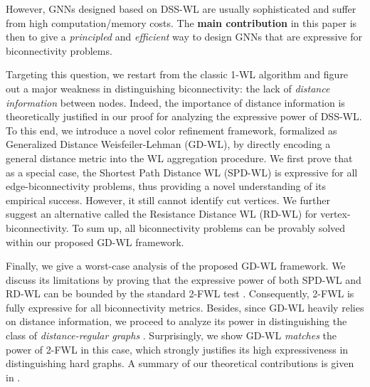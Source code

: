 \documentclass{article}
\let\cref\crtcref
\begin{document}
However, GNNs designed based on DSS-WL are usually sophisticated and suffer from high computation/memory costs. The \textbf{main contribution} in this paper is then to give a \emph{principled} and \emph{efficient} way to design GNNs that are expressive for biconnectivity problems.

Targeting this question, we restart from the classic 1-WL algorithm and figure out a major weakness in distinguishing biconnectivity: the lack of \emph{distance information} between nodes. Indeed, the importance of distance information is theoretically justified in our proof for analyzing the expressive power of DSS-WL. To this end, we introduce a novel color refinement framework, formalized as Generalized Distance Weisfeiler-Lehman (GD-WL), by directly encoding a general distance metric into the WL aggregation procedure. We first prove that as a special case, the Shortest Path Distance WL (SPD-WL) is expressive for all edge-biconnectivity problems, thus providing a novel understanding of its empirical success. However, it still cannot identify cut vertices. We further suggest an alternative called the Resistance Distance WL (RD-WL) for vertex-biconnectivity. To sum up, all biconnectivity problems can be provably solved within our proposed GD-WL framework.

Finally, we give a worst-case analysis of the proposed GD-WL framework. We discuss its limitations by proving that the expressive power of both SPD-WL and RD-WL can be bounded by the standard 2-FWL test . Consequently, 2-FWL is fully expressive for all biconnectivity metrics.  Besides, since GD-WL heavily relies on distance information, we proceed to analyze its power in distinguishing the class of \emph{distance-regular graphs} . Surprisingly, we show GD-WL \emph{matches} the power of 2-FWL in this case, which strongly justifies its high expressiveness in distinguishing hard graphs. A summary of our theoretical contributions is given in \cref{tab:summary_of_results}. 
\end{document}
